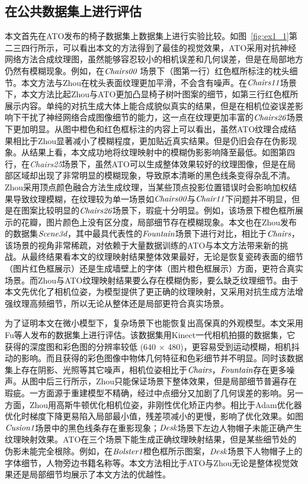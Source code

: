 \subsection{在公共数据集上进行评估}
本文首先在ATO发布的椅子数据集上数据集上进行实验比较。如图~\ref{fig:ex1_1}第二三四行所示，可以看出本文的方法得到了最佳的视觉效果，ATO采用对抗神经网络方法合成纹理图，虽然能够容忍较小的相机误差和几何误差，但是在局部地方仍然有模糊现象。例如，在$\emph{Chairs00}$ 场景下（图第一行）红色框所标注的枕头细节。本文方法与Zhou在枕头表面纹理更加平滑，不会含有噪声。在$\emph{Chairs11}$场景下，本文方法比起Zhou与ATO更加凸显椅子树叶图案的细节，如第三行红色框所展示内容。单纯的对抗生成大体上能合成貌似真实的结果，但是在相机位姿误差影响下干扰了神经网络合成图像细节的能力，这一点在纹理更加丰富的$\emph{Chairs26}$场景下更加明显。从图中橙色和红色框标注的内容上可以看出，虽然ATO纹理合成结果相比于Zhou显著减小了模糊程度，更加贴近真实结果。但是仍旧会存在伪影现象。从结果上看，本文成功地将纹理映射中的模糊伪影影响降至最低。如图第四行，在\emph{Chairs25}场景下，虽然ATO可以生成整体效果较好的纹理图像，但是在局部区域却出现了非常明显的模糊现象，导致原本清晰的黑色线条变得杂乱不清。Zhou采用顶点颜色融合方法生成纹理，当某些顶点投影位置错误时会影响加权结果导致纹理模糊，在纹理较为单一场景如$\emph{Chairs00}$与$\emph{Chair11}$下问题并不明显，但是在图案比较明显的$\emph{Chairs26}$场景下，瑕疵十分明显。例如，该场景下橙色框所展示的花瓣，图片颜色上没有区分度，局部细节存在模糊现象。本文也在Zhou发布的数据集$\emph{Scene3d}$，其中最具代表性的$\emph{Fountain}$场景下进行对比，相比于$\emph{Chairs}$，该场景的视角非常稀疏，对依赖于大量数据训练的ATO与本文方法带来新的挑战。从最终结果看本文的纹理映射结果整体效果最好，无论是恢复瓷砖表面的细节（图片红色框展示）还是生成墙壁上的字体（图片橙色框展示）方面，更符合真实场景。而Zhou与ATO纹理映射结果要么存在模糊伪影，要么缺乏纹理细节。由于本文先优化了相机位姿，为模型提供了更正确的纹理映射，又采用对抗生成方法增强纹理高频细节，所以无论从整体还是局部更符合真实场景。\par

为了证明本文在微小模型下，复杂场景下也能恢复出高保真的外观模型。本文采用Fu等人发布的数据集上进行评估。该数据集用Kinect一代相机拍摄的数据集，它获得的深度图和彩色图的分辨率较低 (640 $\times$ 480)，更容易受到运动模糊，相机抖动的影响。而且获得的彩色图像中物体几何特征和色彩细节并不明显。同时该数据集上存在阴影、光照等其它噪声，相机位姿相比于$\emph{Chairs}$，$\emph{Fountain}$存在更多噪声。从图中后三行所示，Zhou只能保证场景下整体效果，但是局部细节普遍存在瑕疵。一方面源于重建模型不精确，经过中点细分又加剧了几何误差的影响。另一方面，Zhou用高斯牛顿优化相机位姿，非刚性优化矫正内参。相比于Adam优化器优化时梯度下降更易陷入局部最小值，残差项减小的更慢，影响了优化效果。如图$\emph{Cusion1}$场景中的黑色线条存在重影现象；$\emph{Desk}$场景下左边人物帽子未能正确产生纹理映射效果。ATO在三个场景下能生成正确纹理映射结果，但是某些细节处的伪影未能完全根除。例如，在$\emph{Bolster1}$橙色框所示图案，$\emph{Desk}$场景下人物帽子上的字体细节，人物旁边书籍名称等。本文方法相比于ATO与Zhou无论是整体视觉效果还是局部细节均展示了本文方法的优越性。\par

